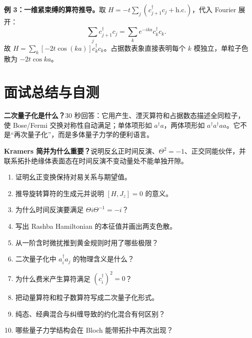 \begin{examplebox}
\textbf{例 3：一维紧束缚的算符推导。}取
$H=-t\sum_j(c_{j+1}^\dagger c_j+\mathrm{h.c.})$，代入 Fourier 展开：
\[
\sum_jc_{j+1}^\dagger c_j
=\sum_k e^{-ika}c_k^\dagger c_k.
\]
故
$H=\sum_k[-2t\cos(ka)]c_k^\dagger c_k$。占据数表象直接表明每个 $k$ 模独立，单粒子色散为 $-2t\cos ka$。
\end{examplebox}

\section{面试总结与自测}
\begin{interviewbox}
\textbf{二次量子化是什么？}30 秒回答：它用产生、湮灭算符和占据数态描述全同粒子，使 Bose/Fermi 交换对称性自动满足；单体项形如 $a^\dagger a$，两体项形如 $a^\dagger a^\dagger aa$。它不是“再次量子化”，而是多体量子力学的便利语言。

\textbf{Kramers 简并为什么重要？}说明反幺正时间反演、$\Theta^2=-1$、正交同能伙伴，并联系拓扑绝缘体表面态在时间反演不变动量处不能单独开隙。
\end{interviewbox}
\begin{selftestbox}
\begin{enumerate}
\item 证明幺正变换保持对易关系与期望值。
\item 推导旋转算符的生成元并说明 $[H,J_z]=0$ 的意义。
\item 为什么时间反演要满足 $\Theta i\Theta^{-1}=-i$？
\item 写出 Rashba Hamiltonian 的本征值并画出两支色散。
\item 从一阶含时微扰推到黄金规则时用了哪些极限？
\item 二次量子化中 $a_i^\dagger a_j$ 的物理含义是什么？
\item 为什么费米产生算符满足 $(c_i^\dagger)^2=0$？
\item 把动量算符和粒子数算符写成二次量子化形式。
\item 纯态、经典混合与纠缠导致的约化混合有何区别？
\item 哪些量子力学结构会在 Bloch 能带拓扑中再次出现？
\end{enumerate}
\end{selftestbox}
